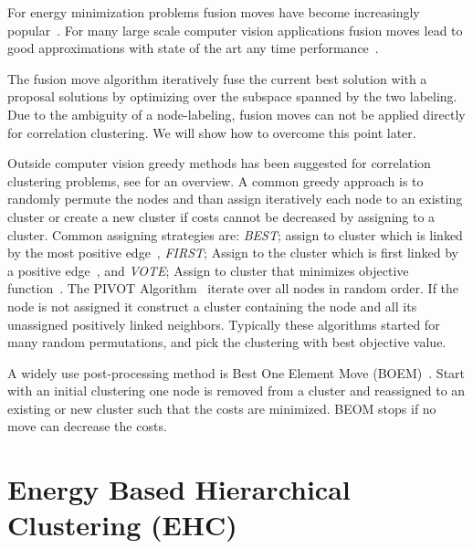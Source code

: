 \documentclass[10pt,twocolumn,letterpaper]{article}
\begin{document}
For energy minimization problems fusion moves have become increasingly popular~\cite{Lempitsky-2010,kappes_2014_ws}.
For many large scale computer vision applications fusion moves lead to good approximations
with state of the art any time performance~\cite{kappes_2014_ws}.

The fusion move algorithm iteratively fuse the current best solution with a proposal solutions
by optimizing over the subspace spanned by the two labeling. 
Due to the ambiguity of a node-labeling, fusion moves can not be applied directly for correlation clustering.
We will show how to overcome this point later.



Outside computer vision greedy methods has been suggested for correlation clustering problems, see \cite{Elsner-2009} for an overview.
A common greedy approach is to randomly permute the nodes and than assign 
iteratively each node to an existing cluster or create a new cluster if costs cannot be decreased by assigning to a cluster.
Common assigning strategies are:
\emph{BEST}; assign to cluster which is linked by the most positive edge~\cite{Ng-2002},
\emph{FIRST}; Assign to the cluster which is first linked by a positive edge~\cite{Soon-2001}, and
\emph{VOTE}; Assign to cluster that minimizes objective function~\cite{Elsner-2008}.
%
The PIVOT Algorithm~\cite{Ailon-2008} iterate over all nodes in random order.
If the node is not assigned it construct a cluster containing the node and all its 
unassigned positively linked neighbors.  
%
Typically these algorithms started for many random permutations, 
and pick the clustering with best objective value.

A widely use post-processing method is  Best One Element Move (BOEM)~\cite{Gionis-2007}.
Start with an initial clustering one node is removed from a cluster and reassigned to an existing or new cluster such that the costs are minimized.
BEOM stops if no move can decrease the costs.



%

\section{Energy Based Hierarchical Clustering (EHC)}\label{sec:ehc}
\end{document}
